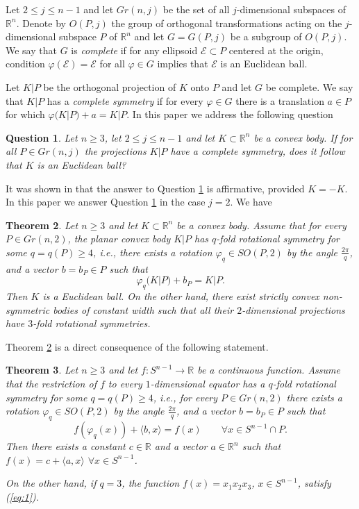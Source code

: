 \documentclass[11pt]{article}
\newtheorem{theorem}{Theorem}[section]
\newtheorem{question}[theorem]{Question}
\theoremstyle{definition}
\begin{document}
Let $2\le j\le n-1$ and let $Gr(n,j)$ be the set of all $j$-dimensional subspaces of ${\mathbb R^n}$. Denote by $O(P,j)$ the group of orthogonal transformations acting on the $j$-dimensional subspace $P$ of ${\mathbb R^n}$ and let $G=G(P,j)$  be a  subgroup of $O(P,j)$. We say that $G$ is {\it complete} if for any ellipsoid ${\mathcal E}\subset P$ centered at the origin, condition $\varphi({\mathcal E})={\mathcal E}$ for all $\varphi\in G$ implies that  ${\mathcal E}$ is an Euclidean ball.

Let \(K|P\) be the orthogonal projection of \(K\) onto \(P\) and let $G$ be complete. We say that \(K|P\) has a  {\it complete symmetry} if  for every  $\varphi\in G$ there is a  translation $a\in P$ for which  $\varphi(K|P)+a=K|P$.
 In this paper we address the following question
\begin{question}\label{vot1}
	Let $n\ge 3$, let $2\le j\le n-1$ and let $K\subset {\mathbb R^n}$ be a convex body. If for all $P\in Gr(n,j)$  the projections $K|P$ have a complete symmetry, does it follow that $K$ is an Euclidean ball?
\end{question}

It was shown in \cite{MRS} that the answer to Question \ref{vot1} is affirmative, provided $K=-K$.
In this paper we answer Question \ref{vot1} in  the case $j=2$. We have
\begin{theorem}\label{cor-main}
	 Let $n\ge 3$ and let \(K\subset\mathbb R^n\) be a convex body. 
	Assume that  for every  \(P\in Gr(n,2)\), the planar
	convex body \(K|P\) has \(q\)-fold rotational symmetry for some  $q=q(P)\ge 4$,  i.e., 
	there exists a rotation $\varphi_q\in SO(P,2)$ by the angle $\frac{2\pi}{q}$,  and a vector $b=b_P\in P$ such that 
	\begin{equation}\label{eq:11}
		\varphi_q(K|P)+ b_P=K|P.
	\end{equation} 
	Then 
 \(K\) is  a Euclidean ball. On the other hand, there exist strictly convex non-symmetric  bodies of constant width such that  all  their $2$-dimensional projections have 
	$3$-fold rotational symmetries.
\end{theorem}

Theorem \ref{cor-main} is a direct consequence of the following statement.



\begin{theorem}\label{cor-Main}
	Let $n\ge 3$ and let $f:S^{n-1}\to\mathbb{R}$ be a continuous function. Assume that  the restriction  of $f$ to every $1$-dimensional equator has a $q$-fold rotational symmetry for some  $q=q(P)\ge 4$, i.e., for every $P\in Gr(n,2)$ there exists a rotation $\varphi_q\in SO(P,2)$ by the angle $\frac{2\pi}{q}$,  and a vector $b=b_P\in P$ such that 
	\begin{equation}\label{eq:1}
		f(\varphi_q(x))+\langle b, x\rangle=f(x)\qquad\forall x\in S^{n-1}\cap P.
		\end{equation} 
		Then there exists a constant $c\in{\mathbb R}$ and a vector $a\in{\mathbb R^n}$ such that  $f(x)=c+\langle a, x\rangle $ $\forall x\in S^{n-1}$.
		
		
		On the other hand, if $q=3$,  the function $f(x)=x_1x_2x_3$, $x\in S^{n-1}$,  satisfy (\ref{eq:1}).
\end{theorem}
\end{document}
